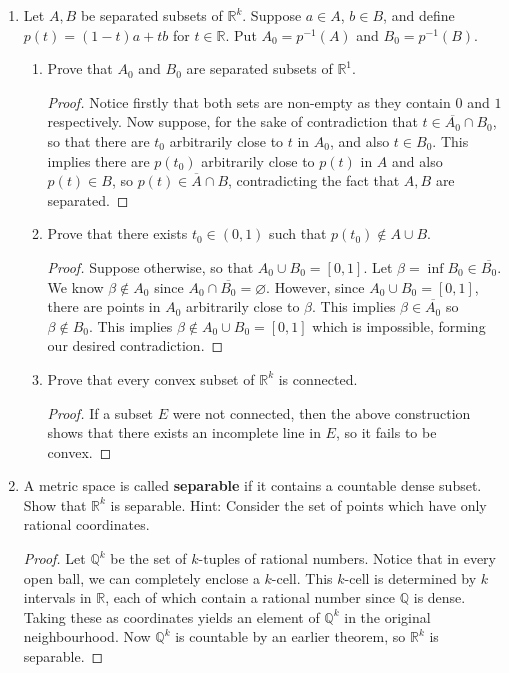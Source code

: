 \documentclass{scrbook}
\newcommand{\Q}{\mathbb{Q}}
\newcommand{\R}{\mathbb{R}}
\let\emptyset\varnothing
\begin{document}
\begin{enumerate}
\item %
Let $A, B$ be separated subsets of $\R^k$. Suppose $a \in A$, $b \in B$, and define $p(t) = (1 - t)a + tb$ for $t \in \R$. Put $A_0 = p^{-1}(A)$ and $B_0 = p^{-1}(B)$.

\begin{enumerate}
\item Prove that $A_0$ and $B_0$ are separated subsets of $\R^1$. 
\begin{proof}
Notice firstly that both sets are non-empty as they contain $0$ and $1$ respectively. Now suppose, for the sake of contradiction that $t \in \overline{A_0} \cap B_0$, so that there are $t_0$ arbitrarily close to $t$ in $A_0$, and also $t \in B_0$. This implies there are $p(t_0)$ arbitrarily close to $p(t)$ in $A$ and also $p(t) \in B$, so $p(t) \in \overline{A} \cap B$, contradicting the fact that $A, B$ are separated.
\end{proof}
\item Prove that there exists $t_0 \in (0, 1)$ such that $p(t_0) \not\in A \cup B$.
\begin{proof}
Suppose otherwise, so that $A_0 \cup B_0 = [0, 1]$. Let $\beta = \inf B_0 \in \overline{B_0}$. We know $\beta \not\in A_0$ since $A_0 \cap \overline{B_0} = \emptyset$. However, since $A_0 \cup B_0 = [0, 1]$, there are points in $A_0$ arbitrarily close to $\beta$. This implies $\beta \in \overline{A_0}$ so $\beta \not\in B_0$. This implies $\beta \not\in A_0 \cup B_0 = [0, 1]$ which is impossible, forming our desired contradiction.
\end{proof}

\item Prove that every convex subset of $\R^k$ is connected.
\begin{proof}
If a subset $E$ were not connected, then the above construction shows that there exists an incomplete line in $E$, so it fails to be convex.
\end{proof}
\end{enumerate}

\item %
A metric space is called \textbf{separable} if it contains a countable dense subset. Show that $\R^k$ is separable. Hint: Consider the set of points which have only rational coordinates.

\begin{proof}
Let $\Q^k$ be the set of $k$-tuples of rational numbers. Notice that in every open ball, we can completely enclose a $k$-cell. This $k$-cell is determined by $k$ intervals in $\R$, each of which contain a rational number since $\Q$ is dense. Taking these as coordinates yields an element of $\Q^k$ in the original neighbourhood. Now $\Q^k$ is countable by an earlier theorem, so $\R^k$ is separable.
\end{proof}


\end{enumerate}
\end{document}
